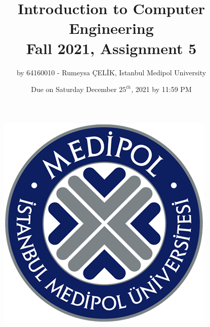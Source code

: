 \documentclass[a4paper, 11pt]{report}
\begin{document}
\begin{figure}
\includegraphics[scale=.63]{medipol.png}
\centering
\end{figure}
\begin{titlepage}
\title{Introduction to Computer Engineering \\ Fall 2021, Assignment 5}
\author{by 64160010 - Rumeysa ÇELİK, Istanbul Medipol University}
\date{Due on Saturday December $25^{th}$, 2021 by 11:59 PM}
\maketitle
\end{titlepage}
{}
\end{document}
